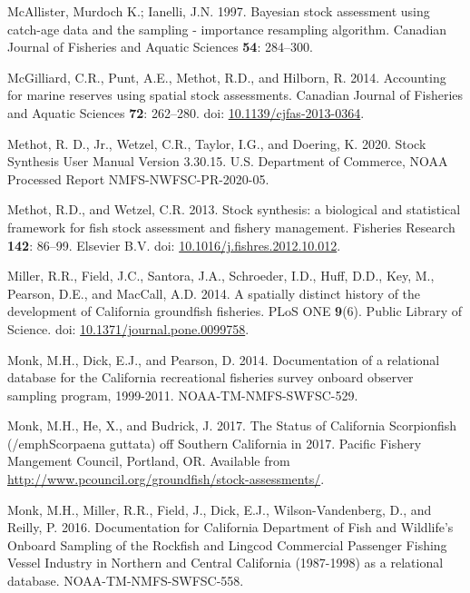 \documentclass[11pt,
  english,
  a4paper,
]{article}
\newlength{\cslhangindent}
\newenvironment{CSLReferences}[2] %
 {%
  \setlength{\parindent}{0pt}
  \ifodd #1 \everypar{\setlength{\hangindent}{\cslhangindent}}\ignorespaces\fi
  \ifnum #2 > 0
  \setlength{\parskip}{#2\baselineskip}
  \fi
 }%
 {}
\begin{document}
\begin{CSLReferences}{1}{0}
\leavevmode{}%
McAllister, Murdoch K.; Ianelli, J.N. 1997. {Bayesian stock assessment using catch-age data and the sampling - importance resampling algorithm}. Canadian Journal of Fisheries and Aquatic Sciences \textbf{54}: 284--300.

\leavevmode{}%
McGilliard, C.R., Punt, A.E., Methot, R.D., and Hilborn, R. 2014. {Accounting for marine reserves using spatial stock assessments}. Canadian Journal of Fisheries and Aquatic Sciences \textbf{72}: 262--280. doi: \href{https://doi.org/10.1139/cjfas-2013-0364}{10.1139/cjfas-2013-0364}.

\leavevmode{}%
Methot, R. D., Jr., Wetzel, C.R., Taylor, I.G., and Doering, K. 2020. {Stock Synthesis User Manual Version 3.30.15}. U.S. Department of Commerce, NOAA Processed Report NMFS-NWFSC-PR-2020-05.

\leavevmode{}%
Methot, R.D., and Wetzel, C.R. 2013. {Stock synthesis: a biological and statistical framework for fish stock assessment and fishery management}. Fisheries Research \textbf{142}: 86--99. Elsevier B.V. doi: \href{https://doi.org/10.1016/j.fishres.2012.10.012}{10.1016/j.fishres.2012.10.012}.

\leavevmode{}%
Miller, R.R., Field, J.C., Santora, J.A., Schroeder, I.D., Huff, D.D., Key, M., Pearson, D.E., and MacCall, A.D. 2014. {A spatially distinct history of the development of California groundfish fisheries}. PLoS ONE \textbf{9}(6). Public Library of Science. doi: \href{https://doi.org/10.1371/journal.pone.0099758}{10.1371/journal.pone.0099758}.

\leavevmode{}%
Monk, M.H., Dick, E.J., and Pearson, D. 2014. {Documentation of a relational database for the California recreational fisheries survey onboard observer sampling program, 1999-2011}. NOAA-TM-NMFS-SWFSC-529.

\leavevmode{}%
Monk, M.H., He, X., and Budrick, J. 2017. {The Status of California Scorpionfish (/emph{Scorpaena guttata}) off Southern California in 2017}. Pacific Fishery Mangement Council, Portland, OR. Available from \url{http://www.pcouncil.org/groundfish/stock-assessments/}.

\leavevmode{}%
Monk, M.H., Miller, R.R., Field, J., Dick, E.J., Wilson-Vandenberg, D., and Reilly, P. 2016. {Documentation for California Department of Fish and Wildlife's Onboard Sampling of the Rockfish and Lingcod Commercial Passenger Fishing Vessel Industry in Northern and Central California (1987-1998) as a relational database}. NOAA-TM-NMFS-SWFSC-558.


\end{CSLReferences}
\end{document}
